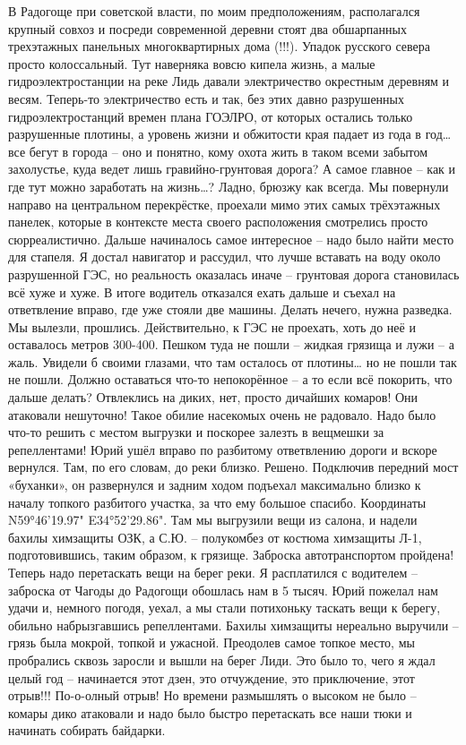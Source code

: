 В Радогоще при советской власти, по моим предположениям, располагался крупный совхоз и посреди современной деревни стоят два обшарпанных трехэтажных панельных многоквартирных дома (!!!). Упадок русского севера просто колоссальный. Тут наверняка вовсю кипела жизнь, а малые гидроэлектростанции на реке Лидь давали электричество окрестным деревням и весям. Теперь-то электричество есть и так, без этих давно разрушенных гидроэлектростанций времен плана ГОЭЛРО, от которых остались только разрушенные плотины, а уровень жизни и обжитости края падает из года в год… все бегут в города – оно и понятно, кому охота жить в таком всеми забытом захолустье, куда ведет лишь гравийно-грунтовая дорога? А самое главное – как и где тут можно заработать на жизнь…? Ладно, брюзжу как всегда. 
Мы повернули направо на центральном перекрёстке, проехали мимо этих самых трёхэтажных панелек, которые в контексте места своего расположения смотрелись просто сюрреалистично. Дальше начиналось самое интересное – надо было найти место для стапеля. Я достал навигатор и рассудил, что лучше вставать на воду около разрушенной ГЭС, но реальность оказалась иначе – грунтовая дорога становилась всё хуже и хуже. В итоге водитель отказался ехать дальше и съехал на ответвление вправо, где уже стояли две машины. Делать нечего, нужна разведка. Мы вылезли, прошлись. Действительно, к ГЭС не проехать, хоть до неё и оставалось метров 300-400. Пешком туда не пошли – жидкая грязища и лужи – а жаль. Увидели б своими глазами, что там осталось от плотины… но не пошли так не пошли. Должно оставаться что-то непокорённое – а то если всё покорить, что дальше делать? Отвлеклись на диких, нет, просто дичайших комаров! Они атаковали нешуточно! Такое обилие насекомых очень не радовало. Надо было что-то решить с местом выгрузки и поскорее залезть в вещмешки за репеллентами!
Юрий ушёл вправо по разбитому ответвлению дороги и вскоре вернулся. Там, по его словам, до реки близко. Решено. Подключив передний мост «буханки», он развернулся и задним ходом подъехал максимально близко к началу топкого разбитого участка, за что ему большое спасибо. Координаты N59°46'19.97" E34°52'29.86". Там мы выгрузили вещи из салона, и надели бахилы химзащиты ОЗК, а С.Ю. – полукомбез от костюма химзащиты Л-1, подготовившись, таким образом, к грязище. Заброска автотранспортом пройдена! Теперь надо перетаскать вещи на берег реки. Я расплатился с водителем – заброска от Чагоды до Радогощи обошлась нам в 5 тысяч. Юрий пожелал нам удачи и, немного погодя, уехал, а мы стали потихоньку таскать вещи к берегу, обильно набрызгавшись репеллентами.
Бахилы химзащиты нереально выручили – грязь была мокрой, топкой и ужасной. Преодолев самое топкое место, мы пробрались сквозь заросли и вышли на берег Лиди. Это было то, чего я ждал целый год – начинается этот дзен, это отчуждение, это приключение, этот отрыв!!! По-о-олный отрыв! Но времени размышлять о высоком не было – комары дико атаковали и надо было быстро перетаскать все наши тюки и начинать собирать байдарки. 
